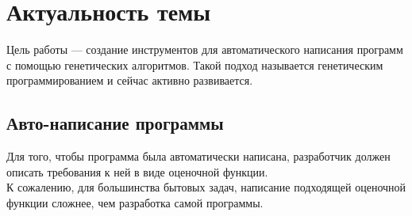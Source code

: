 \documentclass[utf8,a5paper,portrait,10pt,twoside]{eskdtext}
\begin{document}
\renewcommand{\ESKDapprovingName}{Работа допущена к защите}

\renewcommand{\ESKDtheTitleFieldVIII}{
\begin{flushleft}
Направление: 230100 — Информатика и вычислительная техника.\\
Специальность: 230102 — Автоматические системы обработки информации и
управления.

\vspace{10mm}
\parbox[t]{.4\hsize}{
Исполнитель:\\
Научный руководитель:\\
Рецензент:
}
\parbox[t]{.5\hsize}{
Ситник Андрей Андреевич\\
Амосов Владимир Владимирович\\
Евдокимов Виктор Евгеньевич
}
\end{flushleft}}

\renewcommand{\ESKDtheTitleFieldX}{Санкт-Петербург 2010}

\maketitle

\tableofcontents

\newpage
\section{Актуальность темы}

Цель работы — создание инструментов для автоматического написания программ с
помощью генетических алгоритмов. Такой подход называется генетическим
программированием и сейчас активно развивается.\cite{genetic}

\subsection{Авто-написание программы}

Для того, чтобы программа была автоматически написана, разработчик должен
описать требования к ней в виде оценочной функции.\\
К сожалению, для большинства
бытовых задач, написание подходящей оценочной функции сложнее, чем
разработка самой программы.
\end{document}
